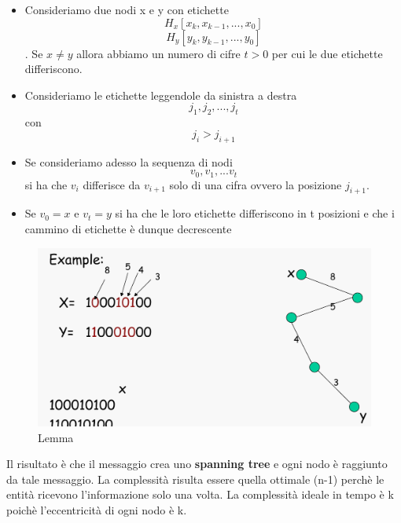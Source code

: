 \documentclass[12pt]{article}
\begin{document}
			\begin{itemize}
				\item Consideriamo due nodi x e y con etichette $$H_x[x_k,x_{k-1},...,x_0] $$ $$H_y[y_k,y_{k-1},...,y_0] $$. Se $x\neq y$ allora abbiamo un numero di cifre $t>0$ per cui le due etichette differiscono.
				\item Consideriamo le etichette leggendole da sinistra a destra $$j_1,j_2,...,j_t$$ con $$j_i>j_{i+1} $$
				\item Se consideriamo adesso la sequenza di nodi $$v_0,v_1,...v_t $$ si ha che $v_i$ differisce da $v_{i+1}$ solo di una cifra ovvero la posizione $j_{i+1}$.
				\item Se $v_0 = x$ e $v_t = y$ si ha che le loro etichette differiscono in t posizioni e che i cammino di etichette è dunque decrescente 
			\end{itemize}
			\begin{figure}[h!]
				\centering
				\includegraphics[scale=0.20]{img/hyper3.png}
				\caption{Lemma}
			\end{figure}
			Il risultato è che il messaggio crea uno \textbf{spanning tree} e ogni nodo è raggiunto da tale messaggio. La complessità risulta essere quella ottimale (n-1) perchè le entità ricevono l'informazione solo una volta. La complessità ideale in tempo è k poichè l'eccentricità di ogni nodo è k.
\end{document}
